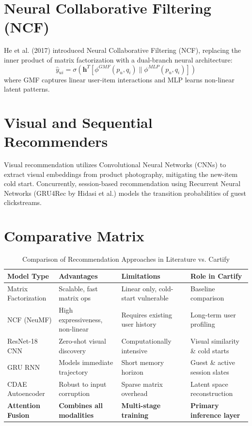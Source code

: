 \documentclass[12pt,a4paper,oneside]{report}
\begin{document}
\section{Neural Collaborative Filtering (NCF)}
He et al. (2017) introduced Neural Collaborative Filtering (NCF), replacing the inner product of matrix factorization with a dual-branch neural architecture:
\begin{equation}
    \hat{y}_{ui} = \sigma \left( \mathbf{h}^T \left[ \phi^{GMF} (p_u, q_i) \parallel \phi^{MLP} (p_u, q_i) \right] \right)
\end{equation}
where GMF captures linear user-item interactions and MLP learns non-linear latent patterns.

\section{Visual and Sequential Recommenders}
Visual recommendation utilizes Convolutional Neural Networks (CNNs) to extract visual embeddings from product photography, mitigating the new-item cold start. Concurrently, session-based recommendation using Recurrent Neural Networks (GRU4Rec by Hidasi et al.) models the transition probabilities of guest clickstreams.

\section{Comparative Matrix}
\begin{table}[H]
    \centering
    \caption{Comparison of Recommendation Approaches in Literature vs. Cartify}
    \begin{tabularx}{\textwidth}{l p{3.5cm} p{3.5cm} X}
        \toprule
        \textbf{Model Type} & \textbf{Advantages} & \textbf{Limitations} & \textbf{Role in Cartify} \\
        \midrule
        Matrix Factorization & Scalable, fast matrix ops & Linear only, cold-start vulnerable & Baseline comparison \\
        NCF (NeuMF) & High expressiveness, non-linear & Requires existing user history & Long-term user profiling \\
        ResNet-18 CNN & Zero-shot visual discovery & Computationally intensive & Visual similarity \& cold starts \\
        GRU RNN & Models immediate trajectory & Short memory horizon & Guest \& active session slates \\
        CDAE Autoencoder & Robust to input corruption & Sparse matrix overhead & Latent space reconstruction \\
        \textbf{Attention Fusion} & \textbf{Combines all modalities} & \textbf{Multi-stage training} & \textbf{Primary inference layer} \\
        \bottomrule
    \end{tabularx}
\end{table}
\end{document}

